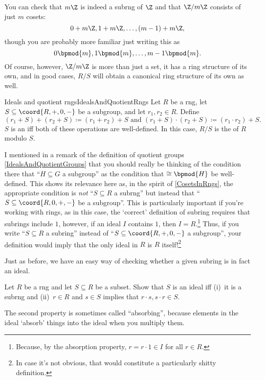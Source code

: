 You can check that $m\Z$ is indeed a subrng of $\Z$ and that $\Z /m\Z$ consists of just $m$ cosets:
\begin{equation}
0+m\Z ,1+m\Z ,\ldots ,(m-1)+m\Z,
\end{equation}
though you are probably more familiar just writing this as
\begin{equation}
0\bpmod{m},1\bpmod{m},\ldots ,m-1\bpmod{m}.
\end{equation}
Of course, however, $\Z /m\Z$ is more than just a set, it has a ring structure of its own, and in good cases, $R/S$ will obtain a canonical ring structure of its own as well.
\begin{dfn}{Ideals and quotient rngs}{IdealsAndQuotientRngs}
Let $R$ be a rng, let $S\subseteq \coord{R,+,0,-}$ be a subgroup, and let $r_1,r_2\in R$.  Define
\begin{equation}
(r_1+S)+(r_2+S)\coloneqq (r_1+r_2)+S\text{ and }(r_1+S)\cdot (r_2+S)\coloneqq (r_1\cdot r_2)+S.
\end{equation}
$S$ is an  iff both of these operations are well-defined.  In this case, $R/S$ is the  of $R$ modulo $S$.
\begin{rmk}
I mentioned in a remark of the definition of quotient groups \cref{IdealsAndQuotientGroups} that you should really be thinking of the condition there that ``$H\subseteq G$ a subgroup'' as the condition that $\cong \bpmod{H}$ be well-defined.  This shows its relevance here as, in the spirit of \cref{CosetsInRngs}, the appropriate condition is \emph{not} ``$S\subseteq R$ a subrng'' but instead that ``$S\subseteq \coord{R,0,+,-}$ be a subgroup''.  This is particularly important if you're working with rings, as in this case, the `correct' definition of subring requires that subrings include $1$, however, if an ideal $I$ contains $1$, then $I=R$.\footnote{Because, by the absorption property, $r=r\cdot 1\in I$ for all $r\in R$.}  Thus, if you write ``$S\subseteq R$ a subring'' instead of ``$S\subseteq \coord{R,+,0,-}$ a subgroup'', your definition would imply that the only ideal in $R$ is $R$ itself!\footnote{In case it's not obvious, that would constitute a particularly shitty definition.}
\end{rmk}
\end{dfn}
Just as before, we have an easy way of checking whether a given subring is in fact an ideal.
\begin{exr}{}{}
Let $R$ be a rng and let $S\subseteq R$ be a subset.  Show that $S$ is an ideal iff (i)~it is a subrng and (ii)~$r\in R$ and $s\in S$ implies that $r\cdot s,s\cdot r\in S$.
\begin{rmk}
The second property is sometimes called ``absorbing'', because elements in the ideal `absorb' things into the ideal when you multiply them.
\end{rmk}
\end{exr}
